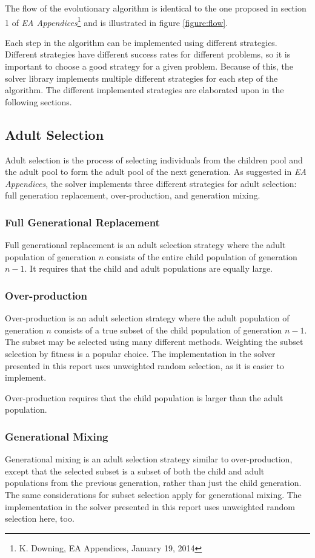 \documentclass[twocolumn,oneside]{amsart}
\begin{document}
The flow of the evolutionary algorithm is identical to the one proposed in section 1 of \textit{EA Appendices}\footnote{K. Downing, EA Appendices, January 19, 2014}
and is illustrated in figure \ref{figure:flow}.

Each step in the algorithm can be implemented using different strategies.
Different strategies have different success rates for different problems, so it is important to choose a good strategy for a given problem.
Because of this, the solver library implements multiple different strategies for each step of the algorithm.
The different implemented strategies are elaborated upon in the following sections.

\subsection{Adult Selection}
Adult selection is the process of selecting individuals from the children pool and the adult pool to form the adult pool of the next generation.
As suggested in \textit{EA Appendices}, the solver implements three different strategies for adult selection: full generation replacement, over-production, and generation mixing.

\subsubsection{Full Generational Replacement}
Full generational replacement is an adult selection strategy where the adult population of generation $ n $ consists of the entire child population of generation $ n - 1 $.
It requires that the child and adult populations are equally large.

\subsubsection{Over-production}
Over-production is an adult selection strategy where the adult population of generation $ n $ consists of a true subset of the child population of generation $ n - 1 $.
The subset may be selected using many different methods.
Weighting the subset selection by fitness is a popular choice.
The implementation in the solver presented in this report uses unweighted random selection, as it is easier to implement.

Over-production requires that the child population is larger than the adult population.

\subsubsection{Generational Mixing}
Generational mixing is an adult selection strategy similar to over-production, except that the selected subset is a subset of both the child and adult populations from the previous generation, rather than just the child generation.
The same considerations for subset selection apply for generational mixing.
The implementation in the solver presented in this report uses unweighted random selection here, too.
\end{document}
